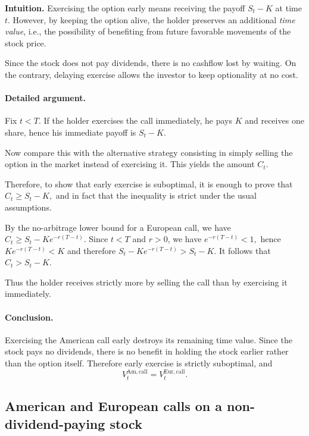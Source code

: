 \documentclass[11pt]{article}
\theoremstyle{definition}
\theoremstyle{plain}
\begin{document}
\medskip

\textbf{Intuition.}
Exercising the option early means receiving the payoff
$
S_t - K
$
at time $t$.
However, by keeping the option alive, the holder preserves an additional \emph{time value}, i.e., the possibility of benefiting from future favorable movements of the stock price.

Since the stock does not pay dividends, there is no cashflow lost by waiting.
On the contrary, delaying exercise allows the investor to keep optionality at no cost.

\medskip

\paragraph{Detailed argument.}

Fix $t<T$. If the holder exercises the call immediately, he pays $K$ and receives one share, hence his immediate payoff is
$
S_t-K.
$

Now compare this with the alternative strategy consisting in simply selling the option in the market instead of exercising it.
This yields the amount
$
C_t.
$

Therefore, to show that early exercise is suboptimal, it is enough to prove that
$
C_t \ge S_t-K,
$
and in fact that the inequality is strict under the usual assumptions.

By the no-arbitrage lower bound for a European call, we have
$
C_t \ge S_t-Ke^{-r(T-t)}.
$
Since $t<T$ and $r>0$, we have
$
e^{-r(T-t)}<1,
$
hence
$
Ke^{-r(T-t)}<K
$
and therefore
$
S_t-Ke^{-r(T-t)} > S_t-K.
$
It follows that
$
C_t > S_t-K.
$

Thus the holder receives strictly more by selling the call than by exercising it immediately.

\paragraph{Conclusion.}

Exercising the American call early destroys its remaining time value.
Since the stock pays no dividends, there is no benefit in holding the stock earlier rather than the option itself.
Therefore early exercise is strictly suboptimal, and
$$
V_t^{\mathrm{Am,call}}=V_t^{\mathrm{Eur,call}}.
$$

\medskip

\subsection{American and European calls on a non-dividend-paying stock}
\end{document}
